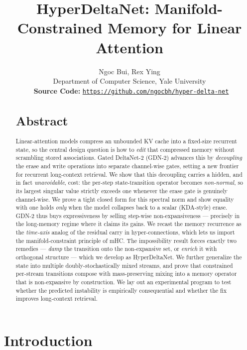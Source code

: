 \documentclass[11pt,letterpaper,logo]{yalearxiv}
\title{HyperDeltaNet: Manifold-Constrained Memory for Linear Attention}
\author{Ngoc Bui\yale, Rex Ying\yale\\
\yale Department of Computer Science, Yale University\\
\faGithub~\textbf{Source Code:} \href{https://github.com/ngocbh/hyper-delta-net}{\texttt{https://github.com/ngocbh/hyper-delta-net}}
}
\begin{document}
\begin{abstract}
\vspace{-1mm}
{\centering\section*{Abstract}}
Linear-attention models compress an unbounded KV cache into a fixed-size recurrent
state, so the central design question is how to \emph{edit} that compressed memory
without scrambling stored associations. Gated DeltaNet-2 (GDN-2) advances this by
\emph{decoupling} the erase and write operations into separate channel-wise gates,
setting a new frontier for recurrent long-context retrieval. We show that this
decoupling carries a hidden, and in fact \emph{unavoidable}, cost: the per-step
state-transition operator becomes \emph{non-normal}, so its largest singular value
strictly exceeds one whenever the erase gate is genuinely channel-wise. We prove a
tight closed form for this spectral norm and show equality with one holds
\emph{only} when the model collapses back to a scalar (KDA-style) erase. GDN-2 thus
buys expressiveness by selling step-wise non-expansiveness --- precisely in the
long-memory regime where it claims its gains. We recast the memory recurrence as the
\emph{time-axis} analog of the residual carry in hyper-connections, which lets us
import the manifold-constraint principle of mHC. The impossibility result forces
exactly two remedies --- \emph{damp} the transition onto the non-expansive set, or
\emph{enrich} it with orthogonal structure --- which we develop as HyperDeltaNet.
We further generalize the state into multiple doubly-stochastically mixed streams,
and prove that constrained per-stream transitions compose with mass-preserving
mixing into a memory operator that is non-expansive by construction. We lay out an
experimental program to test whether the predicted instability is empirically
consequential and whether the fix improves long-context retrieval.
\end{abstract}


\maketitle


\section{Introduction}
\label{sec:intro}
\end{document}
